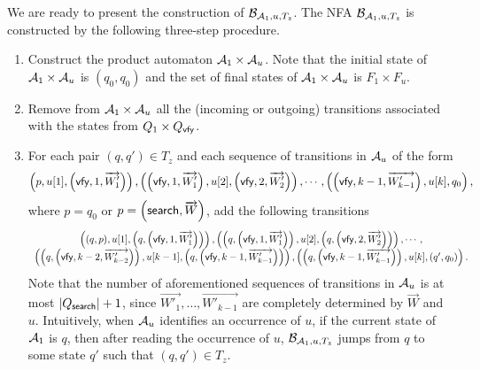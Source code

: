We are ready to present the construction of $\mathcal{B}_{\mathcal{A}_1, u,  T_{z}}$. The NFA $\mathcal{B}_{\mathcal{A}_1, u, T_{z}}$ is constructed by the following three-step procedure.
\begin{enumerate}
\item Construct the product automaton $\mathcal{A}_1 \times \mathcal{A}_u$. Note that the initial state of $\mathcal{A}_1 \times \mathcal{A}_u$ is $(q_{0},q_0)$ and the set of final states of $\mathcal{A}_1 \times \mathcal{A}_u$ is $F_1 \times F_u$.

\item Remove from $\mathcal{A}_1 \times \mathcal{A}_u$ all the (incoming or outgoing) transitions associated with the states from $Q_1 \times Q_{\mathsf{vfy}}$.

\item For each pair $(q,q') \in T_{z}$ and each sequence of transitions in $\mathcal{A}_u$ of the form
$$
\left(p, u[1], \left(\mathsf{vfy}, 1, \overrightarrow{W'_1} \right) \right), \left( \left(\mathsf{vfy}, 1, \overrightarrow{W'_1} \right), u[2],
 \left(\mathsf{vfy}, 2, \overrightarrow{W'_2}\right) \right), 
 \cdots, \left(\left(\mathsf{vfy}, k-1, \overrightarrow{W'_{k-1}} \right), u[k], q_0\right),
$$
where  $p=q_0$ or $p = \left(\mathsf{search}, \overrightarrow{W} \right)$,
add the following transitions
$$
\begin{array}{c}
\left((q,p), u[1], \left(q, \left(\mathsf{vfy}, 1, \overrightarrow{W'_1} \right) \right) \right), 
\left( \left(q, \left(\mathsf{vfy}, 1, \overrightarrow{W'_1} \right) \right), u[2], \left(q, \left(\mathsf{vfy}, 2, \overrightarrow{W'_2}\right)\right)\right),  
\cdots, \\
\left(\left(q, \left(\mathsf{vfy}, k-2, \overrightarrow{W'_{k-2}} \right) \right), u[k-1], \left (q, \left (\mathsf{vfy}, k-1, \overrightarrow{W'_{k-1}} \right) \right) \right),
\left( \left(q, \left (\mathsf{vfy}, k-1, \overrightarrow{W'_{k-1}} \right) \right), u[k], \left(q', q_0 \right)\right).
\end{array}
$$
Note that the number of aforementioned sequences of transitions in $\mathcal{A}_u$ is at most $|Q_{\mathsf{search}}|+1$, since  $ \overrightarrow{W'_1},\dots,  \overrightarrow{W'_{k-1}}$ are completely determined by $\overrightarrow{W} $ and $u$.
Intuitively, when $\mathcal{A}_u$ identifies an occurrence of $u$, if the current state of $\mathcal{A}_1$ is $q$, then after reading the occurrence of $u$, $\mathcal{B}_{\mathcal{A}_1, u, T_z}$ jumps from $q$ to some state $q'$ such that $(q,q') \in T_z$.
\end{enumerate}

